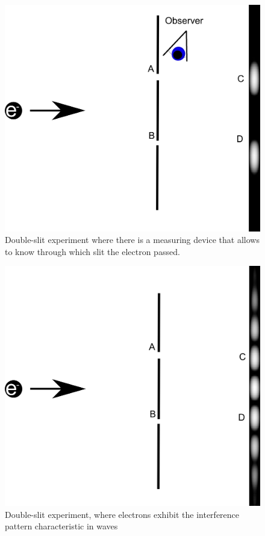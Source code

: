 \begin{figure}[h]
\centering 
\includegraphics[scale=0.15]{Figures/ds_ob.png}
\caption{Double-slit experiment where there is a measuring device that allows to know through which slit the electron passed.}
\label{fig:double_slit_ob}

\end{figure}
\begin{figure}[h]
\centering 

\includegraphics[scale=0.15]{Figures/ds_unob.png}
\caption{Double-slit experiment, where electrons exhibit the interference pattern characteristic in waves}
\label{fig:double_slit_unob}
\end{figure}

